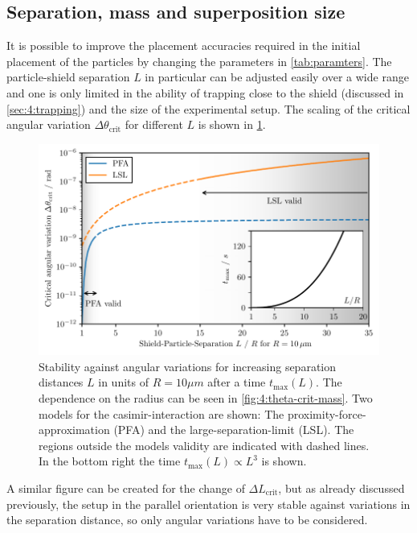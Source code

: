 \newpage
\subsection{Separation, mass and superposition size}
It is possible to improve the placement accuracies required in the initial placement of the particles by changing the parameters in \cref{tab:paramters}.
The particle-shield separation $L$ in particular can be adjusted easily over a wide range and one is only limited in the ability of trapping close to the shield (discussed in \cref{sec:4:trapping}) and the size of the experimental setup.
The scaling of the critical angular variation $\Delta \theta_\mathrm{crit}$ for different $L$ is shown in \cref{fig:4:theta-crit-L}.
\begin{figure}[!htbp]
  \centering
  \includegraphics[width=\textwidth]{./../figures/theta-variance/theta-crit-L.pdf}
  \caption{Stability against angular variations for increasing separation distances $L$ in units of $R=10\si{\mu m}$ after a time $t_\mathrm{max}(L)$. The dependence on the radius can be seen in \cref{fig:4:theta-crit-mass}. Two models for the casimir-interaction are shown: The proximity-force-approximation (PFA) and the large-separation-limit (LSL). The regions outside the models validity are indicated with dashed lines. In the bottom right the time $t_\mathrm{max}(L) \propto L^3$ is shown.}
  \label{fig:4:theta-crit-L}
\end{figure}
A similar figure can be created for the change of $\Delta L_\mathrm{crit}$, but as already discussed previously, the setup in the parallel orientation is very stable against variations in the separation distance, so only angular variations have to be considered.

